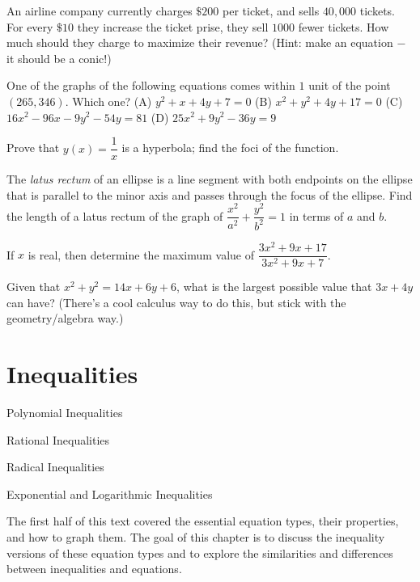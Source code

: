 \documentclass[lang=en,11pt]{elegantbook}
\begin{document}
\begin{challengeset}
\item An airline company currently charges $\$200$ per ticket, and sells $40,000$ tickets. For every $\$10$ they increase the ticket prise, they sell $1000$ fewer tickets. How much should they charge to maximize their revenue? (Hint: make an equation $-$ it should be a conic!) \vspace{3mm}
\item One of the graphs of the following equations comes within $1$ unit of the point $(265,346)$. Which one? \newline 
(A) $y^2+x+4y+7=0$  (B) $x^2+y^2+4y+17=0$  \newline
(C) $16x^2-96x-9y^2-54y=81$  (D) $25x^2+9y^2-36y=9$  \vspace{3mm}
\item Prove that $y(x)=\dfrac{1}{x}$ is a hyperbola; find the foci of the function. \vspace{3mm}
\item The \textit{latus rectum} of an ellipse is a line segment with both endpoints on the ellipse that is parallel to the minor axis and passes through the focus of the ellipse.  Find the length of a latus rectum of the graph of $\dfrac{x^2}{a^2}+\dfrac{y^2}{b^2}=1$ in terms of $a$ and $b$. \vspace{3mm}
\item If $x$ is real, then determine the maximum value of $\dfrac{3x^2+9x+17}{3x^2+9x+7}$. \vspace{3mm}
\item Given that $x^2+y^2=14x+6y+6$, what is the largest possible value that $3x+4y$ can have? (There's a cool calculus way to do this, but stick with the geometry/algebra way.)\vspace{3mm}
\end{challengeset}

\chapter{Inequalities}
\begin{introduction}[Contents]
\item Polynomial Inequalities
\item Rational Inequalities
\item Radical Inequalities
\item Exponential and Logarithmic Inequalities
\end{introduction}
\noindent The first half of this text covered the essential equation types, their properties, and how to graph them.  The goal of this chapter is to discuss the inequality versions of these equation types and to explore the similarities and differences between inequalities and equations.
\end{document}
